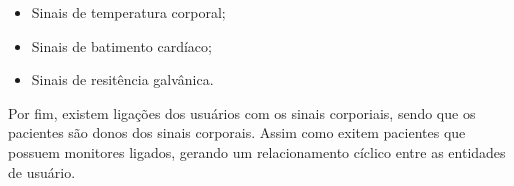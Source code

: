 \begin{itemize}
    \item Sinais de temperatura corporal;
    \item Sinais de batimento cardíaco;
    \item Sinais de resitência galvânica.
\end{itemize}

Por fim, existem ligações dos usuários com os sinais corporiais, sendo que os pacientes
são donos dos sinais corporais. Assim como exitem pacientes que possuem monitores ligados,
gerando um relacionamento cíclico entre as entidades de usuário.
